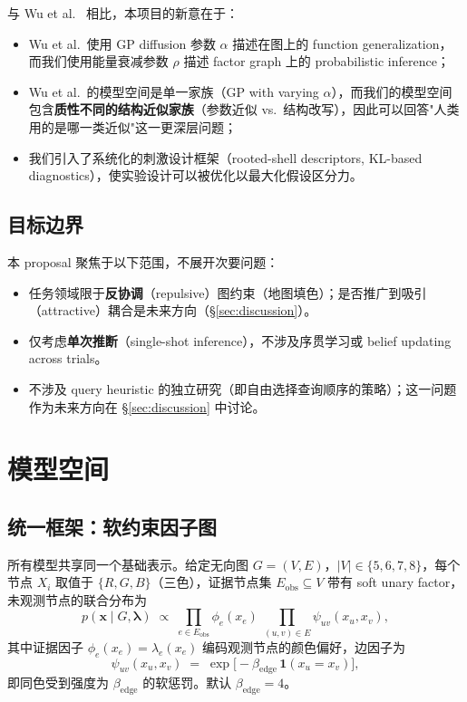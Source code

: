\documentclass[11pt,a4paper]{ctexart}
\begin{document}
与 Wu et al.\ \cite{Wu2021} 相比，本项目的新意在于：
\begin{itemize}
    \item Wu et al.\ 使用 GP diffusion 参数 $\alpha$ 描述在图上的 function generalization，而我们使用能量衰减参数 $\rho$ 描述 factor graph 上的 probabilistic inference；
    \item Wu et al.\ 的模型空间是单一家族（GP with varying $\alpha$），而我们的模型空间包含\textbf{质性不同的结构近似家族}（参数近似 vs.\ 结构改写），因此可以回答"人类用的是哪一类近似"这一更深层问题；
    \item 我们引入了系统化的刺激设计框架（rooted-shell descriptors, KL-based diagnostics），使实验设计可以被优化以最大化假设区分力。
\end{itemize}

\subsection{目标边界}

本 proposal 聚焦于以下范围，不展开次要问题：
\begin{itemize}
    \item 任务领域限于\textbf{反协调}（repulsive）图约束（地图填色）；是否推广到吸引（attractive）耦合是未来方向（§\ref{sec:discussion}）。
    \item 仅考虑\textbf{单次推断}（single-shot inference），不涉及序贯学习或 belief updating across trials。
    \item 不涉及 query heuristic 的独立研究（即自由选择查询顺序的策略）；这一问题作为未来方向在 §\ref{sec:discussion} 中讨论。
\end{itemize}


\section{模型空间}
\label{sec:models}

\subsection{统一框架：软约束因子图}

所有模型共享同一个基础表示。给定无向图 $G=(V,E)$，$|V|\in\{5,6,7,8\}$，每个节点 $X_i$ 取值于 $\{R,G,B\}$（三色），证据节点集 $E_\mathrm{obs}\subseteq V$ 带有 soft unary factor，未观测节点的联合分布为
\begin{equation}
\label{eq:joint}
p(\mathbf{x}\mid G,\boldsymbol{\lambda})
\;\propto\;
\prod_{e\in E_\mathrm{obs}} \phi_e(x_e)
\;\prod_{(u,v)\in E} \psi_{uv}(x_u,x_v),
\end{equation}
其中证据因子 $\phi_e(x_e)=\lambda_e(x_e)$ 编码观测节点的颜色偏好，边因子为
\begin{equation}
\label{eq:pairwise}
\psi_{uv}(x_u,x_v)
\;=\;
\exp\!\bigl[-\beta_\mathrm{edge}\,\mathbf{1}(x_u=x_v)\bigr],
\end{equation}
即同色受到强度为 $\beta_\mathrm{edge}$ 的软惩罚。默认 $\beta_\mathrm{edge}=4$。
\end{document}

